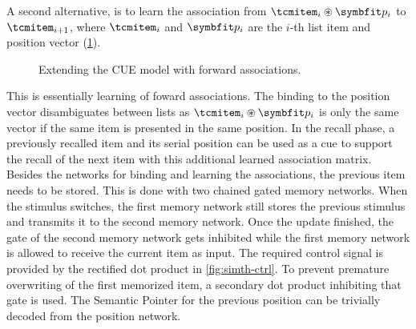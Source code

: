 A second alternative, is to learn the association from $\tcmitem_i \circledast \vc p_i$ to $\tcmitem_{i+1}$, where $\tcmitem_i$ and $\vc p_i$ are the $i$-th list item and position vector (\cref{fig:hebb-forward}).
\begin{figure}
    \centering
    \caption{Extending the CUE model with forward associations.}\label{fig:hebb-forward}
\end{figure}
This is essentially learning of foward associations.
The binding to the position vector disambiguates between lists as $\tcmitem_i \circledast \vc p_i$ is only the same vector if the same item is presented in the same position.
In the recall phase, a previously recalled item and its serial position can be used as a cue to support the recall of the next item with this additional learned association matrix.
Besides the networks for binding and learning the associations, the previous item needs to be stored.
This is done with two chained gated memory networks.
When the stimulus switches, the first memory network still stores the previous stimulus and transmits it to the second memory network.
Once the update finished, the gate of the second memory network gets inhibited while the first memory network is allowed to receive the current item as input.
The required control signal  is provided by the rectified dot product in \cref{fig:simth-ctrl}.
To prevent premature overwriting of the first memorized item, a secondary dot product inhibiting that gate is used.
The Semantic Pointer for the previous position can be trivially decoded from the position network.

